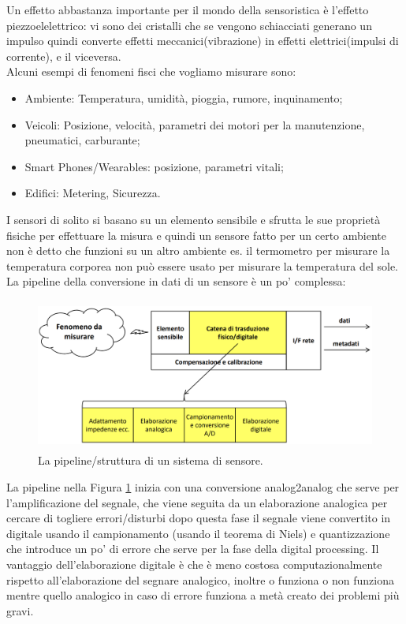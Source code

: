 \documentclass[11pt, twocolumn]{article}
\newenvironment{myitemize}
{ \begin{itemize}[topsep=0ex]
		\setlength{\itemsep}{0pt}
		\setlength{\parskip}{0pt}
		\setlength{\parsep}{0pt}     }
	{ \end{itemize}                  }
\begin{document}
\noindent Un effetto abbastanza importante per il mondo della sensoristica è l'effetto piezzoelelettrico: vi sono dei cristalli che se vengono schiacciati generano un impulso quindi converte effetti meccanici(vibrazione) in effetti elettrici(impulsi di corrente), e il viceversa.\\
Alcuni esempi di fenomeni fisci che vogliamo misurare sono:
\begin{myitemize}
  \item Ambiente: Temperatura, umidità, pioggia, rumore, inquinamento;
  \item Veicoli: Posizione, velocità, parametri dei motori per la manutenzione, pneumatici, carburante;
  \item Smart Phones/Wearables: posizione, parametri vitali;
  \item Edifici: Metering, Sicurezza.
\end{myitemize}
I sensori di solito si basano su un elemento sensibile e sfrutta le sue proprietà fisiche per effettuare la misura e quindi un sensore fatto per un certo ambiente non è detto che funzioni su un altro ambiente es. il termometro per misurare la temperatura corporea non può essere usato per misurare la temperatura del sole.
La pipeline della conversione in dati di un sensore è un po' complessa:
\begin{figure}[!h]
  \centering
  \includegraphics[width=\linewidth,height=5cm]{imgs/catena_sensore.png}
  \caption{La pipeline/struttura di un sistema di sensore.}
  \label{fig:circuit_chain}
\end{figure}
\noindent La pipeline nella Figura \ref{fig:circuit_chain} inizia con una conversione analog2analog che serve per l'amplificazione del segnale, che viene seguita da un elaborazione analogica per cercare di togliere errori/disturbi dopo questa fase il segnale viene convertito in digitale usando il campionamento (usando il teorema di Niels) e quantizzazione che introduce un po' di errore che serve per la fase della digital processing.
Il vantaggio dell'elaborazione digitale è che è meno costosa computazionalmente rispetto all'elaborazione del segnare analogico, inoltre o funziona o non funziona mentre quello analogico in caso di errore funziona a metà creato dei problemi più gravi.\\
\end{document}
